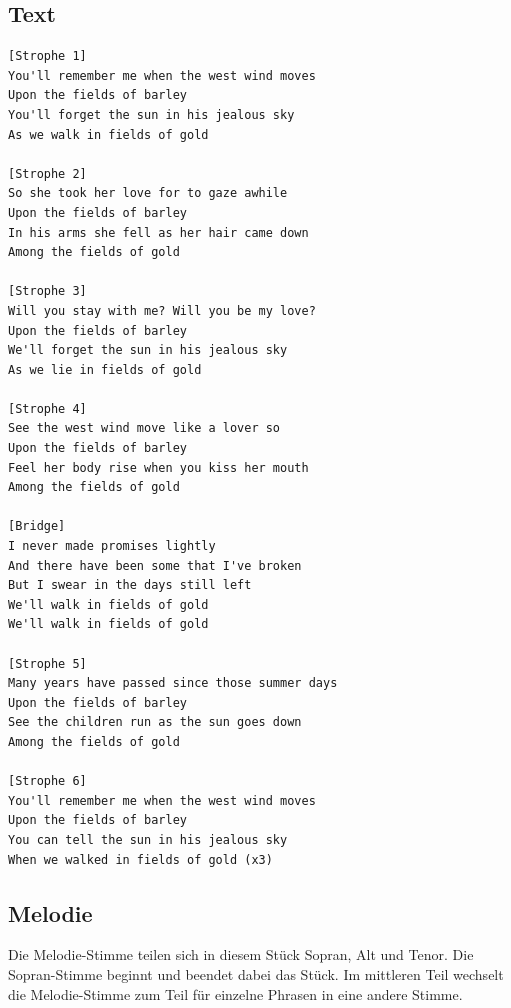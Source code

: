 \subsection*{Text}

\begin{small}
\begin{verbatim}
[Strophe 1]
You'll remember me when the west wind moves
Upon the fields of barley
You'll forget the sun in his jealous sky
As we walk in fields of gold

[Strophe 2]
So she took her love for to gaze awhile
Upon the fields of barley
In his arms she fell as her hair came down
Among the fields of gold

[Strophe 3]
Will you stay with me? Will you be my love?
Upon the fields of barley
We'll forget the sun in his jealous sky
As we lie in fields of gold

[Strophe 4]
See the west wind move like a lover so
Upon the fields of barley
Feel her body rise when you kiss her mouth
Among the fields of gold

[Bridge]
I never made promises lightly
And there have been some that I've broken
But I swear in the days still left
We'll walk in fields of gold
We'll walk in fields of gold

[Strophe 5]
Many years have passed since those summer days
Upon the fields of barley
See the children run as the sun goes down
Among the fields of gold

[Strophe 6]
You'll remember me when the west wind moves
Upon the fields of barley
You can tell the sun in his jealous sky
When we walked in fields of gold (x3)
\end{verbatim}
\end{small}

\subsection*{Melodie}

Die Melodie-Stimme teilen sich in diesem Stück Sopran, Alt und Tenor. Die Sopran-Stimme beginnt und beendet dabei das Stück. Im mittleren Teil wechselt die Melodie-Stimme zum Teil für einzelne Phrasen in eine andere Stimme.


